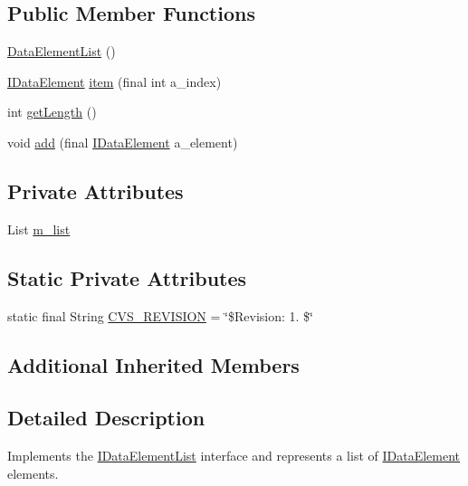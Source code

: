 \subsection*{Public Member Functions}
\begin{DoxyCompactItemize}
\item 
\hyperlink{classorg_1_1jgap_1_1data_1_1_data_element_list_a6285d213b0ee9a28dde846575ee2cecd}{Data\-Element\-List} ()
\item 
\hyperlink{interfaceorg_1_1jgap_1_1data_1_1_i_data_element}{I\-Data\-Element} \hyperlink{classorg_1_1jgap_1_1data_1_1_data_element_list_a290108fd96fa020e72c3160b15658cea}{item} (final int a\-\_\-index)
\item 
int \hyperlink{classorg_1_1jgap_1_1data_1_1_data_element_list_a6d056f165ee8750d5bc3f2d8f096a38f}{get\-Length} ()
\item 
void \hyperlink{classorg_1_1jgap_1_1data_1_1_data_element_list_af5e6a9df8ae1a30164bb2395ec00449e}{add} (final \hyperlink{interfaceorg_1_1jgap_1_1data_1_1_i_data_element}{I\-Data\-Element} a\-\_\-element)
\end{DoxyCompactItemize}
\subsection*{Private Attributes}
\begin{DoxyCompactItemize}
\item 
List \hyperlink{classorg_1_1jgap_1_1data_1_1_data_element_list_aab2c6e6fec62fb03c59d7c94d2d61cc2}{m\-\_\-list}
\end{DoxyCompactItemize}
\subsection*{Static Private Attributes}
\begin{DoxyCompactItemize}
\item 
static final String \hyperlink{classorg_1_1jgap_1_1data_1_1_data_element_list_a396fcd81cfc3dd931a0ee1f6f4496964}{C\-V\-S\-\_\-\-R\-E\-V\-I\-S\-I\-O\-N} = \char`\"{}\$Revision\-: 1. \$\char`\"{}
\end{DoxyCompactItemize}
\subsection*{Additional Inherited Members}


\subsection{Detailed Description}
Implements the \hyperlink{interfaceorg_1_1jgap_1_1data_1_1_i_data_element_list}{I\-Data\-Element\-List} interface and represents a list of \hyperlink{interfaceorg_1_1jgap_1_1data_1_1_i_data_element}{I\-Data\-Element} elements.


